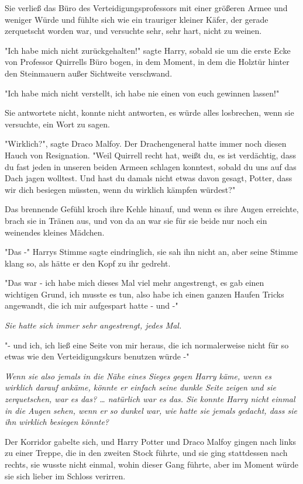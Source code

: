 {Sie verließ das Büro des Verteidigungsprofessors mit einer größeren Armee und weniger Würde und fühlte sich wie ein trauriger kleiner Käfer, der gerade zerquetscht worden war, und versuchte sehr, sehr hart, nicht zu weinen.

"Ich habe mich nicht zurückgehalten!" sagte Harry, sobald sie um die erste Ecke von Professor Quirrells Büro bogen, in dem Moment, in dem die Holztür hinter den Steinmauern außer Sichtweite verschwand.

"Ich habe mich nicht verstellt, ich habe nie einen von euch gewinnen lassen!"

Sie antwortete nicht, konnte nicht antworten, es würde alles losbrechen, wenn sie versuchte, ein Wort zu sagen.

"Wirklich?", sagte Draco Malfoy. Der Drachengeneral hatte immer noch diesen Hauch von Resignation. "Weil Quirrell recht hat, weißt du, es ist verdächtig, dass du fast jeden in unseren beiden Armeen schlagen konntest, sobald du uns auf das Dach jagen wolltest. Und hast du damals nicht etwas davon gesagt, Potter, dass wir dich besiegen müssten, wenn du wirklich kämpfen würdest?"

Das brennende Gefühl kroch ihre Kehle hinauf, und wenn es ihre Augen erreichte, brach sie in Tränen aus, und von da an war sie für sie beide nur noch ein weinendes kleines Mädchen.

"Das -" Harrys Stimme sagte eindringlich, sie sah ihn nicht an, aber seine Stimme klang so, als hätte er den Kopf zu ihr gedreht.

"Das war - ich habe mich dieses Mal viel mehr angestrengt, es gab einen wichtigen Grund, ich musste es tun, also habe ich einen ganzen Haufen Tricks angewandt, die ich mir aufgespart hatte - und -"

\emph{Sie hatte sich immer sehr angestrengt, jedes Mal.}

"- und ich, ich ließ eine Seite von mir heraus, die ich normalerweise nicht für so etwas wie den Verteidigungskurs benutzen würde -"

\emph{Wenn sie also jemals in die Nähe eines Sieges gegen Harry käme, wenn es wirklich darauf ankäme, könnte er einfach seine dunkle Seite zeigen und sie zerquetschen, war es das? … natürlich war es das. Sie konnte Harry nicht einmal in die Augen sehen, wenn er so dunkel war, wie hatte sie jemals gedacht, dass sie ihn wirklich besiegen könnte?}

Der Korridor gabelte sich, und Harry Potter und Draco Malfoy gingen nach links zu einer Treppe, die in den zweiten Stock führte, und sie ging stattdessen nach rechts, sie wusste nicht einmal, wohin dieser Gang führte, aber im Moment würde sie sich lieber im Schloss verirren.

}
